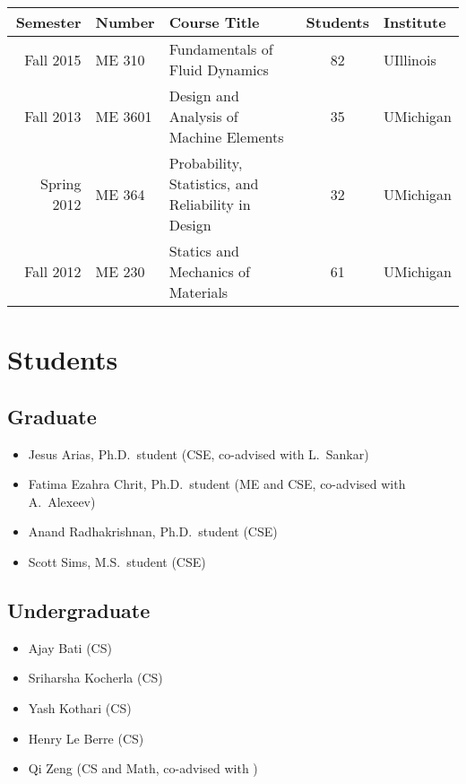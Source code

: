 \begin{center}
    \begin{tabular}{ r l l c l }
        \hline\hline
        \bf Semester  &\bf Number & \bf Course Title & \bf Students & \bf Institute \\
        \hline
        Fall   2015 & ME 310  & Fundamentals of Fluid Dynamics & 82 & UIllinois \\
        Fall   2013 & ME 3601 & Design and Analysis of Machine Elements & 35 & UMichigan\\
        Spring 2012 & ME 364  & Probability, Statistics, and Reliability in Design & 32 & UMichigan \\
        Fall   2012 & ME 230  & Statics and Mechanics of Materials & 61 & UMichigan \\
        \hline\hline
    \end{tabular}
\end{center}


\section{Students}

\subsection{Graduate}

\begin{itemize}
    \item Jesus Arias, Ph.D.\ student (CSE, co-advised with L.\ Sankar)
    \item Fatima Ezahra Chrit, Ph.D.\ student (ME and CSE, co-advised with A.\ Alexeev)
    \item Anand Radhakrishnan, Ph.D.\ student (CSE)
    \item Scott Sims, M.S.\ student (CSE)
\end{itemize}

\subsection{Undergraduate}

\begin{itemize}
    \item Ajay Bati (CS)
    \item Sriharsha Kocherla (CS)
    \item Yash Kothari (CS)
    \item Henry Le Berre (CS)
    \item Qi Zeng (CS and Math, co-advised with \Florian)
\end{itemize}

